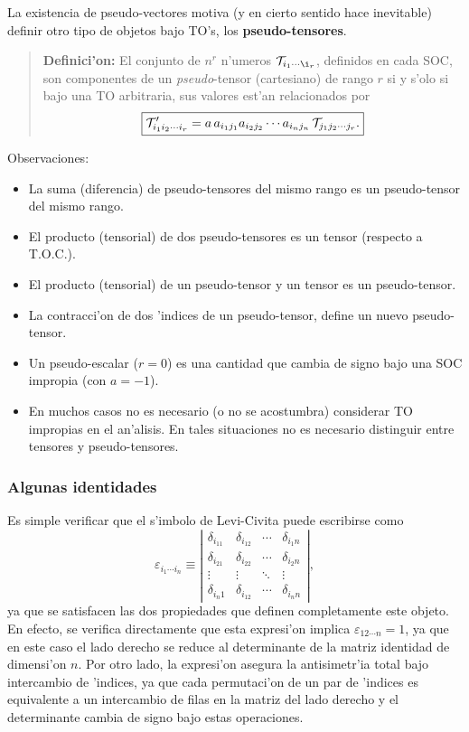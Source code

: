 La existencia de pseudo-vectores motiva (y en cierto sentido hace inevitable) definir otro tipo de objetos bajo TO's, los \textbf{pseudo-tensores}.

\begin{quotation}
\textbf{Definici'on:} El conjunto de $n^r$ n'umeros ${\cal T}_{i_1\cdots\i_r}$, definidos en cada SOC, son componentes de un \textit{pseudo}-tensor (cartesiano) de rango $r$ si y s'olo si bajo una TO arbitraria, sus valores est'an relacionados por 
\begin{equation}\label{dcalTr}
\boxed{{\cal T}'_{i_1i_2\cdots i_r}=a\,a_{i_1j_1}a_{i_2j_2}\cdots a_{i_nj_n}\,{\cal T}_{j_1j_2\cdots j_r}.}
\end{equation}
\end{quotation}
Observaciones:
\begin{itemize}
\item La suma (diferencia) de pseudo-tensores del mismo rango es un pseudo-tensor del mismo rango.
\item El producto (tensorial) de dos pseudo-tensores es un tensor (respecto a T.O.C.).
\item El producto (tensorial) de un pseudo-tensor y un tensor es un pseudo-tensor.
\item La contracci'on de dos 'indices de un pseudo-tensor, define un nuevo pseudo-tensor.
\item Un pseudo-escalar ($r=0$) es una cantidad que cambia de signo bajo una SOC impropia (con $a=-1$).
\item En muchos casos no es necesario (o no se acostumbra) considerar TO impropias en el an'alisis. En tales situaciones no es necesario distinguir entre tensores y pseudo-tensores.
\end{itemize}

\subsubsection{Algunas identidades}
Es simple verificar que el s'imbolo de Levi-Civita puede escribirse como
\begin{equation}\label{epdet}
\varepsilon_{i_1\cdots i_n}\equiv  \left|\begin{array}{cccc}
\delta_{i_11} & \delta_{i_12} & \cdots & \delta_{i_1n} \\ 
\delta_{i_21} & \delta_{i_22} & \cdots & \delta_{i_2n} \\ 
\vdots & \vdots & \ddots & \vdots \\ 
\delta_{i_n1} & \delta_{i_12} & \cdots & \delta_{i_nn}
\end{array} \right| ,
\end{equation}
ya que se satisfacen las dos propiedades que definen completamente este objeto. En efecto, se verifica directamente que esta expresi'on implica $\varepsilon_{12\cdots n}=1$, ya que en este caso el lado derecho se reduce al determinante de la matriz identidad de dimensi'on $n$. Por otro lado, la expresi'on asegura la antisimetr'ia total bajo intercambio de 'indices, ya que cada permutaci'on de un par de 'indices es equivalente a un intercambio de filas en la matriz del lado derecho y el determinante cambia de signo bajo estas operaciones.

